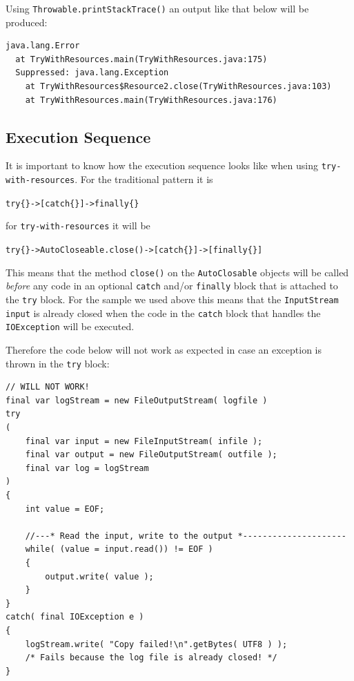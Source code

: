 \documentclass[11pt,a4paper, titlepage, parskip=half, headsepline, footsepline, cleardoublepage=current, headheight=1cm]{scrbook}
\begin{document}
Using \lstinline|Throwable.printStackTrace()| an output like that below will be produced:
\begin{lstlisting}
java.lang.Error
  at TryWithResources.main(TryWithResources.java:175)
  Suppressed: java.lang.Exception
    at TryWithResources$Resource2.close(TryWithResources.java:103)
    at TryWithResources.main(TryWithResources.java:176)
\end{lstlisting}

\subsection{Execution Sequence}\label{sec:ExecutionSequence}
It is important to know how the execution sequence looks like when using \lstinline|try-with-resources|. For the traditional pattern it is\\
\begin{center}
\verb#try{}->[catch{}]->finally{}#
\end{center} 
for \lstinline|try-with-resources| it will be\\ 
\begin{center}
\verb#try{}->AutoCloseable.close()->[catch{}]->[finally{}]#
\end{center}

This means that the method \lstinline|close()| on the \lstinline|AutoClosable| objects will be called \textit{before} any code in an optional \lstinline|catch| and/or \lstinline|finally| block that is attached to the \lstinline|try| block. For the sample we used above this means that the \lstinline|InputStream input| is already closed when the code in the \lstinline|catch| block that handles the \lstinline|IOException| will be executed.

Therefore the code below will not work as expected in case an exception is thrown in the \lstinline|try| block:
\begin{lstlisting}
// WILL NOT WORK!
final var logStream = new FileOutputStream( logfile )
try
(   
    final var input = new FileInputStream( infile );
    final var output = new FileOutputStream( outfile );
    final var log = logStream 
)
{
	int value = EOF;
	
    //---* Read the input, write to the output *---------------------
    while( (value = input.read()) != EOF )
    {
        output.write( value );
    }
}
catch( final IOException e )
{
    logStream.write( "Copy failed!\n".getBytes( UTF8 ) );
    /* Fails because the log file is already closed! */
}
\end{lstlisting}
\end{document}
